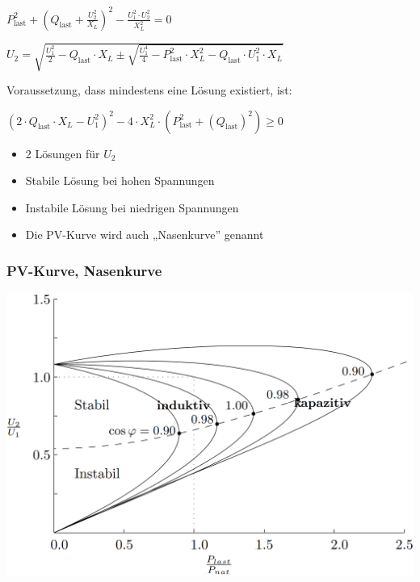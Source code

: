 $
\boxed{
P_{\text{last}}^2 + \left(Q_{\text{last}} + \frac{U_2^2}{X_L} \right)^2 - \frac{U_1^2 \cdot U_2^2}{X_L^2} = 0
}
$

\vspace{0.15cm}

$
\boxed{
U_2 = \sqrt{
\frac{U_1^2}{2} - Q_{\text{last}} \cdot X_L 
\pm \sqrt{
\frac{U_1^4}{4} - P_{\text{last}}^2 \cdot X_L^2 - Q_{\text{last}} \cdot U_1^2 \cdot X_L}}}
$

\vspace{0.15cm}

Voraussetzung, dass mindestens eine Lösung existiert, ist:

\vspace{0.15cm}

$
\boxed{
\left(2 \cdot Q_{\text{last}} \cdot X_L - U_1^2 \right)^2 - 4 \cdot X_L^2 \cdot \left(P_{\text{last}}^2 + \left(Q_{\text{last}}\right)^2 \right) \geq 0
}
$

\vspace{0.15cm}

\begin{itemize}
  \item 2 Lösungen für $U_2$
  \item Stabile Lösung bei hohen Spannungen
  \item Instabile Lösung bei niedrigen Spannungen
  \item Die PV-Kurve wird auch „Nasenkurve” genannt
\end{itemize}


\subsubsection{PV-Kurve, Nasenkurve}

\includegraphics[width=0.98\columnwidth, align=c]{images/Nasenkurve.png}






